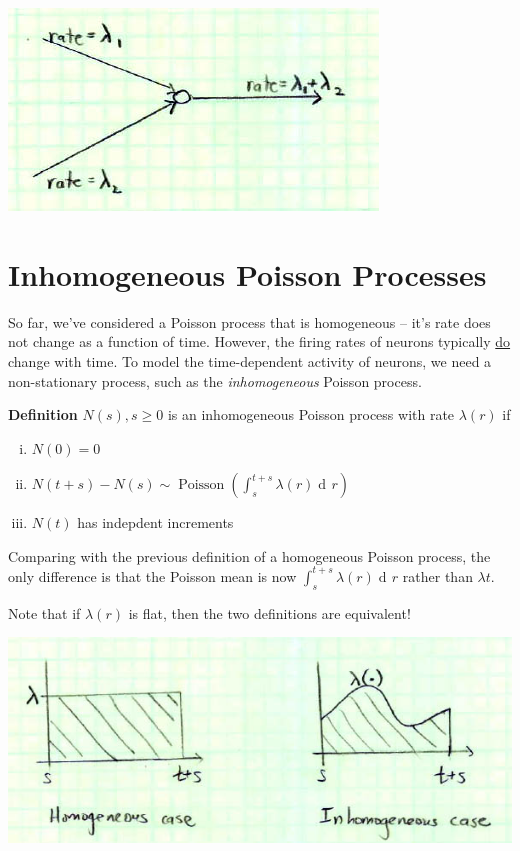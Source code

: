 \documentclass[11pt]{article}
\DeclareMathOperator{\dif}{d\!}
\DeclareMathOperator{\Poisson}{Poisson}
\newenvironment{propertybox}{%
   \def\FrameCommand{\colorbox{LightSteelBlue}}%
   \MakeFramed{\advance\hsize-\width \FrameRestore}}
 {\endMakeFramed}
\begin{document}
\begin{center}
\includegraphics[scale=0.5]{Figure9.jpg}
\end{center}

\section{Inhomogeneous Poisson Processes}
So far, we've considered a Poisson process that is homogeneous -- it's rate does not change as a function of time. However,
the firing rates of neurons typically \underline{do} change with time. To model the time-dependent activity of neurons, we need
a non-stationary process, such as the \emph{inhomogeneous} Poisson process.

\begin{propertybox}
{\bf Definition} $N(s), s \geq 0$ is an inhomogeneous Poisson process with rate $\lambda(r)$ if
\begin{enumerate}[(i)]
\item $N(0) = 0$
\item $N(t + s) - N(s) \sim \Poisson(\int_s^{t+s} \lambda(r) \dif r)$
\item $N(t)$ has indepdent increments
\end{enumerate}
\end{propertybox}
Comparing with the previous definition of a homogeneous Poisson process, the only difference is that the Poisson mean is now
$\int_s^{t+s} \lambda(r) \dif r$ rather than $\lambda t$.

Note that if $\lambda(r)$ is flat, then the two definitions are equivalent!

\begin{center}
\includegraphics[scale=0.5]{Figure10.jpg}
\end{center}
\end{document}
